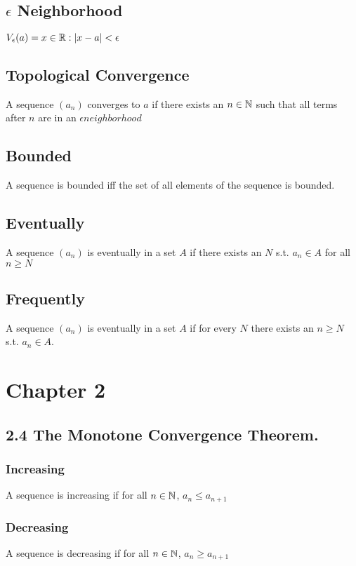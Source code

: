 \documentclass{article}
\begin{document}
\subsection{$\epsilon$ Neighborhood}
$V_\epsilon (a) = {x \in \protect\mathbb{R} : |x-a| < \epsilon}$

\subsection{Topological Convergence}
A sequence $(a_n)$ converges to $a$ if there exists an $n \in \protect\mathbb{N}$ such that all terms after $n$ are in an $\epsilon neighborhood$

\subsection{Bounded}
A sequence is bounded iff the set of all elements of the sequence is bounded.

\subsection{Eventually}
A sequence $(a_n)$ is eventually in a set $A$ if there exists an $N$ s.t. $a_n \in A$ for all $n \ge N$

\subsection{Frequently}
A sequence $(a_n)$ is eventually in a set $A$ if for every $N$  there exists an $n \ge N$ s.t. $a_n \in A$.

\section*{Chapter 2}
\subsection*{2.4 The Monotone Convergence Theorem.}

\subsubsection*{Increasing}
A sequence is increasing if for all $n \in \protect\mathbb{N}$, $a_n \le a_{n+1}$
\subsubsection*{Decreasing}
A sequence is decreasing if for all $n \in \protect\mathbb{N}$, $a_n \ge a_{n+1}$
\end{document}
